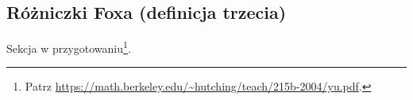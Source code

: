 
\subsection{Różniczki Foxa (definicja trzecia)}
Sekcja w przygotowaniu\footnote{Patrz \url{https://math.berkeley.edu/~hutching/teach/215b-2004/yu.pdf}.}.


